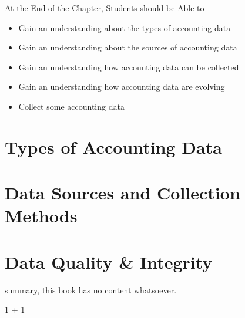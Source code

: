 \documentclass[
  letterpaper,
  DIV=11,
  numbers=noendperiod]{scrreprt}
\newenvironment{Shaded}{\begin{snugshade}}{\end{snugshade}}
\newcommand{\DecValTok}[1]{\textcolor[rgb]{0.68,0.00,0.00}{#1}}
\newcommand{\SpecialCharTok}[1]{\textcolor[rgb]{0.37,0.37,0.37}{#1}}
\begin{document}
\begin{tcolorbox}[enhanced jigsaw, arc=.35mm, bottomrule=.15mm, bottomtitle=1mm, breakable, colback=white, colbacktitle=quarto-callout-note-color!10!white, colframe=quarto-callout-note-color-frame, coltitle=black, left=2mm, leftrule=.75mm, opacityback=0, opacitybacktitle=0.6, rightrule=.15mm, title=\textcolor{quarto-callout-note-color}{\faInfo}\hspace{0.5em}{Learning Objectives}, titlerule=0mm, toprule=.15mm, toptitle=1mm]

At the End of the Chapter, Students should be Able to -

\begin{itemize}
\item
  Gain an understanding about the types of accounting data
\item
  Gain an understanding about the sources of accounting data
\item
  Gain an understanding how accounting data can be collected
\item
  Gain an understanding how accounting data are evolving
\item
  Collect some accounting data
\end{itemize}

\end{tcolorbox}

\section{Types of Accounting Data}\label{types-of-accounting-data}

\section{Data Sources and Collection
Methods}\label{data-sources-and-collection-methods}

\section{Data Quality \& Integrity}\label{data-quality-integrity}

summary, this book has no content whatsoever.

\begin{Shaded}
\begin{Highlighting}[]
\DecValTok{1} \SpecialCharTok{+} \DecValTok{1}
\end{Highlighting}
\end{Shaded}
\end{document}
